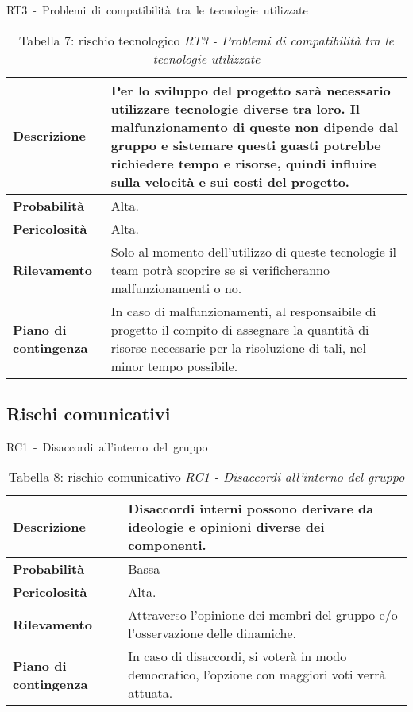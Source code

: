 \documentclass[italian,12pt]{article} %
\begin{document}
\begin{table}[!h]
    \centering
    \hbox{RT3 - Problemi di compatibilità tra le tecnologie utilizzate}
    \vspace{0.3cm}
	\begin{tabular}{|l|p{10cm}|} 
		\hline
		\textbf{Descrizione} & Per lo sviluppo del progetto sarà necessario utilizzare tecnologie diverse tra loro. Il malfunzionamento di queste non dipende dal gruppo e sistemare questi guasti potrebbe richiedere tempo e risorse, quindi influire sulla velocità e sui costi del progetto. \\ 
        \hline
        \textbf{Probabilità} & Alta. \\
        \hline
        \textbf{Pericolosità} & Alta. \\
        \hline
        \textbf{Rilevamento} & Solo al momento dell'utilizzo di queste tecnologie il team potrà scoprire se si verificheranno malfunzionamenti o no.  \\
        \hline
        \textbf{Piano di contingenza} & In caso di malfunzionamenti, al responsaibile di progetto il compito di assegnare la quantità di risorse necessarie per la risoluzione di tali, nel minor tempo possibile. \\
		\hline
	\end{tabular}
    \caption{Tabella 7: rischio tecnologico \textit{RT3 - Problemi di compatibilità tra le tecnologie utilizzate}}
\end{table}


\begin{table}[!h]
    \subsection{Rischi comunicativi}
    \centering
    \hbox{RC1 - Disaccordi all'interno del gruppo }
    \vspace{0.3cm}
	\begin{tabular}{|l|p{10cm}|} 
		\hline
		\textbf{Descrizione} & Disaccordi interni possono derivare da ideologie e opinioni diverse dei componenti.  \\ 
        \hline
        \textbf{Probabilità} & Bassa \\
        \hline
        \textbf{Pericolosità} & Alta. \\
        \hline
        \textbf{Rilevamento} & Attraverso l'opinione dei membri del gruppo e/o l'osservazione delle dinamiche. \\
        \hline
        \textbf{Piano di contingenza} & In caso di disaccordi, si voterà in modo democratico, l'opzione con maggiori voti verrà attuata. \\
		\hline
	\end{tabular}
    \caption{Tabella 8: rischio comunicativo \textit{RC1 - Disaccordi all'interno del gruppo}}
\end{table}
\end{document}
